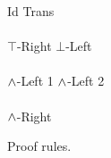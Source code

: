 \begin{FIGURE}
\begin{RULES}

  \ZEROPREMISERULENAMEDRIGHT
  {
    \phi \judge \phi
  }{Id}
    \qquad
  \TWOPREMISERULENAMEDRIGHT
  {
    \phi \judge \psi
  }
  {
    \psi \judge \xi
  }
  {
    \phi \judge \xi
  }{Trans}
    \\\\
  \ZEROPREMISERULENAMEDRIGHT
  {
    \phi \judge \top
  }{$\top$-Right}
    \qquad
  \ZEROPREMISERULENAMEDRIGHT
  {
    \bot \judge \phi
  }{$\bot$-Left}
    \\\\
  \ONEPREMISERULENAMEDRIGHT
  {
    \phi \judge \psi
  }
  {
    \phi \AND \xi \judge \psi
  }{$\land$-Left 1}
     \qquad
  \ONEPREMISERULENAMEDRIGHT
  {
    \phi \judge \psi
  }
  {
    \xi \AND \phi  \judge \psi
  }{$\land$-Left 2}
     \\\\
  \TWOPREMISERULENAMEDRIGHT
  {
    \phi \judge \psi
  }
  {
    \phi \judge \xi
  }
  {
    \phi \judge \psi \AND \xi
  }{$\land$-Right}
\end{RULES}
\caption{Proof rules.}\label{figure:elAndBangRules}
\end{FIGURE}
